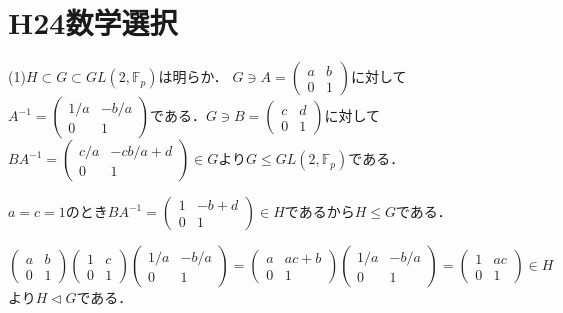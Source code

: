 \documentclass[
		book,
		head_space=20mm,
		foot_space=20mm,
		gutter=10mm,
		line_length=190mm
]{jlreq}
\begin{document}
\section{H24数学選択}
(1)$H\subset G\subset GL(2,\mathbb{F}_p)$は明らか．
$G\ni A=\begin{pmatrix}
a & b \\
0 & 1
\end{pmatrix}$に対して$A^{-1}=\begin{pmatrix}
1/a & -b/a \\
0 & 1
\end{pmatrix}$である．$G \ni B=\begin{pmatrix}
    c & d \\
    0 & 1
    \end{pmatrix}$に対して$BA^{-1}=\begin{pmatrix}
        c/a & -cb/a + d \\
        0 & 1
        \end{pmatrix}\in G$より$G\le GL(2,\mathbb{F}_p)$である．

$a=c=1$のとき$BA^{-1}=\begin{pmatrix}
    1 & -b+d \\
    0 & 1
    \end{pmatrix}\in H$であるから$H\le G$である．

$\begin{pmatrix}
a & b \\
0 & 1
\end{pmatrix}\begin{pmatrix}
1 & c \\
0 & 1
\end{pmatrix}\begin{pmatrix}
1/a & -b/a \\
0 & 1
\end{pmatrix}=\begin{pmatrix}
a & ac + b \\
0 & 1
\end{pmatrix}\begin{pmatrix}
1/a & -b/a \\
0 & 1
\end{pmatrix}=\begin{pmatrix}
1 & ac \\
0 & 1
\end{pmatrix}\in H$より$H \triangleleft G$である．
\end{document}

